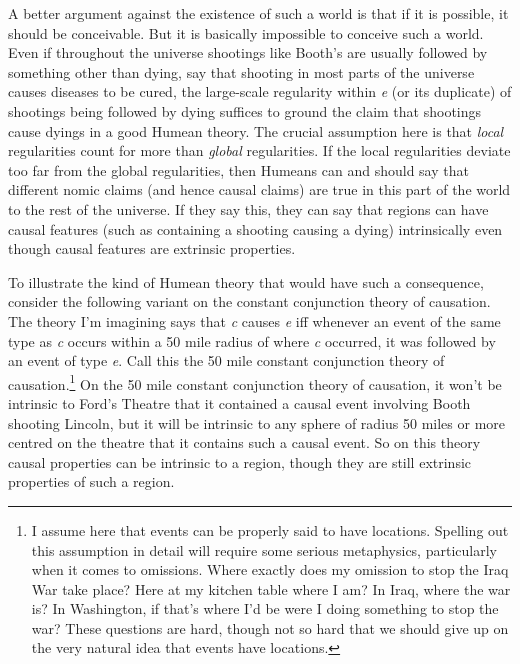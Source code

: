 \documentclass[
  10pt,
  letterpaper,
  DIV=11,
  numbers=noendperiod,
  twoside]{scrartcl}
\begin{document}
A better argument against the existence of such a world is that if it is
possible, it should be conceivable. But it is basically impossible to
conceive such a world. Even if throughout the universe shootings like
Booth's are usually followed by something other than dying, say that
shooting in most parts of the universe causes diseases to be cured, the
large-scale regularity within \emph{e} (or its duplicate) of shootings
being followed by dying suffices to ground the claim that shootings
cause dyings in a good Humean theory. The crucial assumption here is
that \emph{local} regularities count for more than \emph{global}
regularities. If the local regularities deviate too far from the global
regularities, then Humeans can and should say that different nomic
claims (and hence causal claims) are true in this part of the world to
the rest of the universe. If they say this, they can say that regions
can have causal features (such as containing a shooting causing a dying)
intrinsically even though causal features are extrinsic properties.

To illustrate the kind of Humean theory that would have such a
consequence, consider the following variant on the constant conjunction
theory of causation. The theory I'm imagining says that \emph{c} causes
\emph{e} iff whenever an event of the same type as \emph{c} occurs
within a 50 mile radius of where \emph{c} occurred, it was followed by
an event of type \emph{e}. Call this the 50 mile constant conjunction
theory of causation.\footnote{I assume here that events can be properly
  said to have locations. Spelling out this assumption in detail will
  require some serious metaphysics, particularly when it comes to
  omissions. Where exactly does my omission to stop the Iraq War take
  place? Here at my kitchen table where I am? In Iraq, where the war is?
  In Washington, if that's where I'd be were I doing something to stop
  the war? These questions are hard, though not so hard that we should
  give up on the very natural idea that events have locations.} On the
50 mile constant conjunction theory of causation, it won't be intrinsic
to Ford's Theatre that it contained a causal event involving Booth
shooting Lincoln, but it will be intrinsic to any sphere of radius 50
miles or more centred on the theatre that it contains such a causal
event. So on this theory causal properties can be intrinsic to a region,
though they are still extrinsic properties of such a region.
\end{document}
